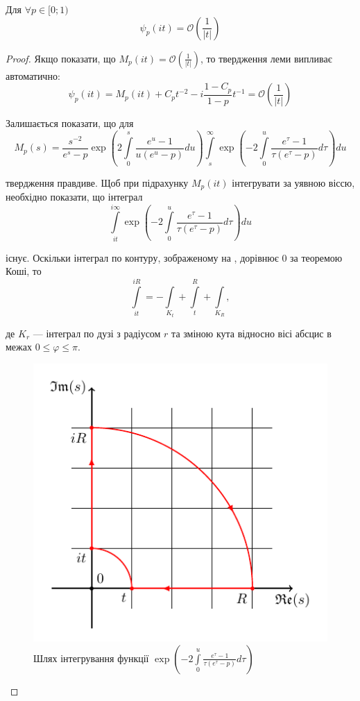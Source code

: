 \begin{lem}
\label{lem:psi_im_ax_asympt}
Для $\forall p \in [0; 1)$
\begin{equation}
\psi_{p}(it) = \mathcal{O}\left(\frac{1}{|t|}\right)
\end{equation}
\begin{proof}
Якщо показати, що $M_{p}(it) = \mathcal{O}\left(\frac{1}{|t|}\right)$, то твердження леми випливає автоматично:
\begin{equation*}
\psi_{p}(it)=M_{p}(it) + C_{p} t^{-2} - i \frac{1-C_{p}}{1 - p} t^{-1} = \mathcal{O}\left(\frac{1}{|t|}\right)
\end{equation*}

Залишається показати, що для
\begin{equation*}
M_{p}(s) = \frac{s^{-2}}{e^s-p} \exp \left(2 \int\limits_{0}^{s} \frac{e^u -1}{u(e^u - p)} du\right) \int\limits_s^\infty \exp\left(-2 \int\limits_{0}^{u} \frac{e^\tau -1}{\tau(e^\tau - p)} d\tau\right) du 
\end{equation*}

твердження правдиве. Щоб при підрахунку $M_{p}(it)$ інтегрувати за уявною віссю, необхідно показати, що інтеграл
\begin{equation*}
\int\limits_{it}^{i\infty} \exp\left(-2 \int\limits_{0}^{u} \frac{e^\tau -1}{\tau(e^\tau - p)} d\tau\right) du 
\end{equation*}

існує. Оскільки інтеграл по контуру, зображеному на , дорівнює 0 за теоремою Коші, то
\begin{equation*}
\int\limits_{it}^{iR} = -\int\limits_{K_{t}} + \int\limits_{t}^{R} + \int\limits_{K_{R}},
\end{equation*}

де $K_{r}$ --- інтеграл по дузі з радіусом $r$ та зміною кута відносно вісі абсцис в межах $0 \leq \varphi \leq \pi$.
\begin{figure}[h]
	\centering
	\includegraphics{chapter_Asymptotics/img/contour_quarter}
	\caption{Шлях інтегрування функції $\exp\left(-2 \int\limits_{0}^{u} \frac{e^\tau -1}{\tau(e^\tau - p)} d\tau\right)$}
	\label{fig:contour_phi}
\end{figure}


\end{proof}
\end{lem}
